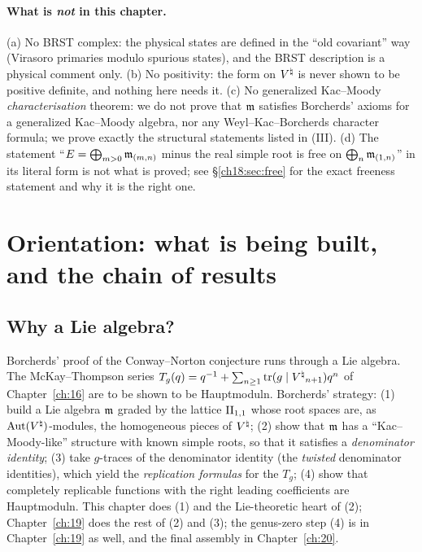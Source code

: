 \paragraph{What is \emph{not} in this chapter.}  (a) No BRST complex: the physical states are
defined in the ``old covariant'' way (Virasoro primaries modulo spurious states), and the BRST
description is a physical comment only.  (b) No positivity: the form on ${V^{\natural}}$ is never shown to be
positive definite, and nothing here needs it.  (c) No generalized Kac--Moody \emph{characterisation}
theorem: we do not prove that $\mathfrak{m}$ satisfies Borcherds' axioms for a generalized Kac--Moody
algebra, nor any Weyl--Kac--Borcherds character formula; we prove exactly the structural statements
listed in (III).  (d) The statement ``$E=\bigoplus_{m>0}\mathfrak{m}_{(m,n)}$ minus the real simple root
is free on $\bigoplus_n\mathfrak{m}_{(1,n)}$'' in its literal form is not what is proved; see
\S\ref{ch18:sec:free} for the exact freeness statement and why it is the right one.

\section{Orientation: what is being built, and the chain of results}\label{ch18:sec:intro}

\subsection{Why a Lie algebra?}

Borcherds' proof of the Conway--Norton conjecture runs through a Lie algebra.  The McKay--Thompson
series $T_g(q)=q^{-1}+\sum_{n\ge1}\operatorname{tr}(g\mid{V^{\natural}}_{n+1})q^n$ of Chapter~\ref{ch:16} are to be shown to be
Hauptmoduln.  Borcherds' strategy: (1) build a Lie algebra $\mathfrak{m}$ graded by the lattice
$\mathrm{II}_{1,1}$ whose root spaces are, as $\operatorname{Aut}({V^{\natural}})$-modules, the homogeneous pieces of ${V^{\natural}}$; (2)
show that $\mathfrak{m}$ has a ``Kac--Moody-like'' structure with known simple roots, so that it satisfies
a \emph{denominator identity}; (3) take $g$-traces of the denominator identity (the \emph{twisted}
denominator identities), which yield the \emph{replication formulas} for the $T_g$; (4) show that
completely replicable functions with the right leading coefficients are Hauptmoduln.  This chapter
does (1) and the Lie-theoretic heart of (2); Chapter~\ref{ch:19} does the rest of (2) and (3); the
genus-zero step (4) is in Chapter~\ref{ch:19} as well, and the final assembly in Chapter~\ref{ch:20}.

